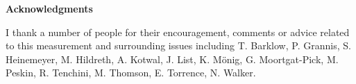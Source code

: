 \documentclass[12pt]{article}
\def\Acknowledgments{\bigskip  \bigskip \begin{center} \begin{large}
             \bf Acknowledgments \end{large}\end{center}}
\begin{document}
\Acknowledgments
I thank a number of people for their encouragement, comments or advice related to this measurement and surrounding issues 
including T. Barklow, P. Grannis, S. Heinemeyer, M. Hildreth, A. Kotwal, J. List, K. M\"{o}nig, G. Moortgat-Pick, M. Peskin, 
R. Tenchini, M. Thomson, E. Torrence, N. Walker.

%



\end{document}
